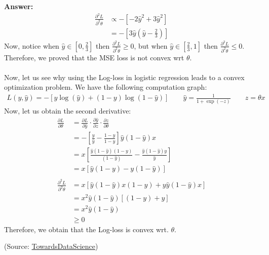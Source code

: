 \documentclass{article}
\newenvironment{QandA}{\begin{enumerate}[label=\arabic*.]}{\end{enumerate}}
\newenvironment{answer}{\par\normalfont \textbf{Answer:}}{}
\begin{document}
\begin{QandA}
\begin{answer}
\begin{align*}
            \frac{\partial^2 L}{\partial^2 \theta} &\propto -\left[ -2\hat{y}^2 + 3\hat{y}^2 \right] \\
            &= -\left[ 3\hat{y} (\hat{y} - \frac{2}{3})\right]
        \end{align*}
        Now, notice when $\hat{y} \in \left[ 0, \frac{2}{3}\right]$ then $\frac{\partial^2 L}{\partial^2 \theta} \ge 0$, but when $\hat{y} \in \left[ \frac{2}{3}, 1\right]$ then $\frac{\partial^2 L}{\partial^2 \theta} \le 0$. Therefore, we proved that the MSE loss is not convex wrt $\theta$.\\\\
        Now, let us see why using the Log-loss in logistic regression leads to a convex optimization problem. We have the following computation graph:
        \begin{align*}
            L(y, \hat{y}) = - \left[y\log(\hat{y}) + (1-y) \log(1-\hat{y})\right] \quad\quad \hat{y} = \frac{1}{1 + \exp(-z)} \quad\quad z = \theta x
        \end{align*}
        Now, let us obtain the second derivative:
        \begin{align*}
            \frac{\partial L}{\partial \theta} &= \frac{\partial L}{\partial \hat{y}} \cdot \frac{\partial \hat{y}}{\partial z} \cdot \frac{\partial z}{\partial \theta} \\
            &= -\left[ \frac{y}{\hat{y}} - \frac{1-y}{1-\hat{y}} \right]\hat{y}(1-\hat{y})x \\
            &= x \left[ \frac{\hat{y}(1-\hat{y})(1-y)}{(1-\hat{y})} - \frac{\hat{y}(1-\hat{y})y}{\hat{y}} \right] \\
            &= x \left[ \hat{y}(1-y) - y(1-\hat{y}) \right] \\\\
            \frac{\partial^2 L}{\partial^2 \theta} &= x \left[ \hat{y}(1-\hat{y})x(1-y) + y\hat{y}(1-\hat{y})x \right] \\
            &= x^2 \hat{y} (1-\hat{y}) \left[ (1 - y) + y \right] \\
            &= x^2\hat{y}(1-\hat{y})\\
            &\ge 0
        \end{align*}
        Therefore, we obtain that the Log-loss is convex wrt. $\theta$.

        (Source: \href{https://towardsdatascience.com/why-not-mse-as-a-loss-function-for-logistic-regression-589816b5e03c}{TowardsDataScience})
    \end{answer}


\end{QandA}
\end{document}
